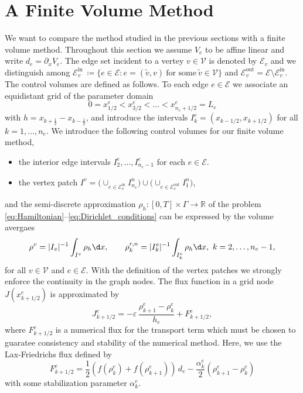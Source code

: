 \chapter{A Finite Volume Method}
\label{ch2}

We want to compare the method studied in the previous sections with a finite volume method. Throughout this section we assume $V_e$ to be affine linear and write $d_e = \partial_x V_e$. The edge set incident to a vertey $v\in \mathcal{V}$ is denoted by $\mathcal{E}_v$ and we distinguish among $\mathcal{E}_v^{\text{in}}\ \coloneqq \{e\in \mathcal{E}\colon e=(\widetilde v,v)\ \text{for some}\ \widetilde v\in \mathcal{V}\}$ and $\mathcal{E}_v^{\text{out}} = \mathcal{E} \setminus \mathcal{E}_v^{\text{in}}$. The control volumes are defined as follows. To each edge $e\in \mathcal{E}$ we associate an equidistant grid of the parameter domain
\begin{equation*}
	0 = x^e_{1/2} < x^e_{3/2} <\ldots < x^e_{n_e+1/2} = L_e
\end{equation*}
with $h=x_{k+\frac12} - x_{k-\frac12}$, and introduce the intervals $I_k^e = (x_{k-1/2}, x_{k+1/2})$ for all $k=1,\ldots,n_e$. We introduce the following control volumes for our finite volume method,
\begin{itemize}
	\item the interior edge intervals $I_2^e,\ldots,I_{n_e-1}^e$ for
	each $e\in \mathcal{E}$.
	\item the vertex patch $I^v = \big(\cup_{e\in \mathcal{E}_v^{\text{in}}} I_{n_e}^n\big)
	\cup \big(\cup_{e\in \mathcal{E}_v^{\text{out}}} I_1^n\big)$,
\end{itemize}
and the semi-discrete approximation $\rho_h \colon [0,T]\times\Gamma\to\mathbb{R}$ of the problem \eqref{eq:Hamiltonian}--\eqref{eq:Dirichlet_conditions} can be expressed by the volume avergaes
\begin{align*}	
	\rho^{v}= |I_v|^{-1}\int_{I^v}\rho_h\d x, \qquad
	\rho_k^{r,n} = |I_k^e|^{-1}\int_{I_k^e} \rho_h\d x,\ k=2,\ldots,n_e-1,
\end{align*}
for all $v\in \mathcal{V}$ and $e\in \mathcal{E}$. With the definition of the vertex patches we strongly enforce the continuity in the graph nodes. The flux function in a grid node $J(x^e_{k+1/2})$ is approximated by
\begin{equation*}
	J_{k+1/2}^e = -\varepsilon\,\frac{\rho_{k+1}^e-\rho_k^e}{h_e}
	+ F^e_{k+1/2},
\end{equation*}
where $F^e_{k+1/2}$ is a numerical flux for the transport term which must be chosen to guaratee consistency and stability of the numerical method. Here, we use the Lax-Friedrichs flux defined by
\begin{equation*}
	F^e_{k+1/2} = \frac12 (f(\rho_k^e) + f(\rho_{k+1}^e))\,d_e - \frac{\alpha_k^e}2
	(\rho_{k+1}^e - \rho_k^e) 
\end{equation*}
with some stabilization parameter $\alpha_k^e$.

